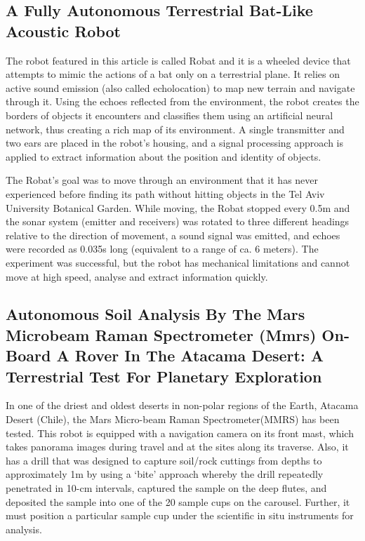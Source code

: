 \documentclass[12pt, twoside]{article}
\begin{document}
\subsection{A Fully Autonomous Terrestrial Bat-Like Acoustic Robot\cite{1}}
The robot featured in this article is called Robat and it is a wheeled device that attempts to mimic the actions of a bat only on a terrestrial plane. It relies on active sound emission (also called echolocation) to map new terrain and navigate through it. Using the echoes reflected from the environment, the robot creates the borders of objects it encounters and classifies them using an artificial neural network, thus creating a rich map of its environment. A single transmitter and two ears are placed in the robot's housing, and a signal processing approach is applied to extract information about the position and identity of objects.

The Robat's goal was to move through an environment that it has never experienced before finding its path without hitting objects in the Tel Aviv University Botanical Garden. While moving, the Robat stopped every 0.5m and the sonar system (emitter and receivers) was rotated to three different headings relative to the direction of movement, a sound signal was emitted, and echoes were recorded as 0.035s long (equivalent to a range of ca. 6 meters). The experiment was successful, but the robot has mechanical limitations and cannot move at high speed, analyse and extract information quickly.

\subsection{Autonomous Soil Analysis By The Mars Microbeam Raman Spectrometer (Mmrs) On-Board A Rover In The Atacama Desert: A Terrestrial Test For Planetary Exploration\cite{2}}
In one of the driest and oldest deserts in non-polar regions of the Earth, Atacama Desert (Chile), the Mars Micro-beam Raman Spectrometer(MMRS) has been tested. This robot is equipped with a navigation camera on its front mast, which takes panorama images during travel and at the sites along its traverse. Also, it has a drill that was designed to capture soil/rock cuttings from depths to approximately 1m by using a ‘bite’ approach whereby the drill repeatedly penetrated in 10-cm intervals, captured the sample on the deep flutes, and deposited the sample into one of the 20 sample cups on the carousel. Further, it must position a particular sample cup under the scientific in situ instruments for analysis.
\end{document}
